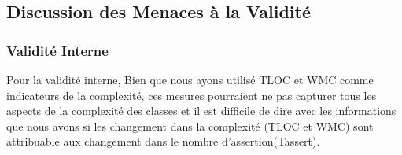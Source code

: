 \documentclass[10pt]{article}
\begin{document}





\subsection{Discussion des Menaces à la Validité}


\subsubsection{Validité Interne}
Pour la validité interne, Bien que nous ayons utilisé TLOC et WMC comme indicateurs de la complexité, ces mesures pourraient ne pas capturer tous les aspects de la complexité des classes et il est difficile de  dire avec les informations que nous avons si les changement dans la complexité (TLOC et WMC) sont attribuable aux changement dans le nombre d'assertion(Tassert).
\end{document}
